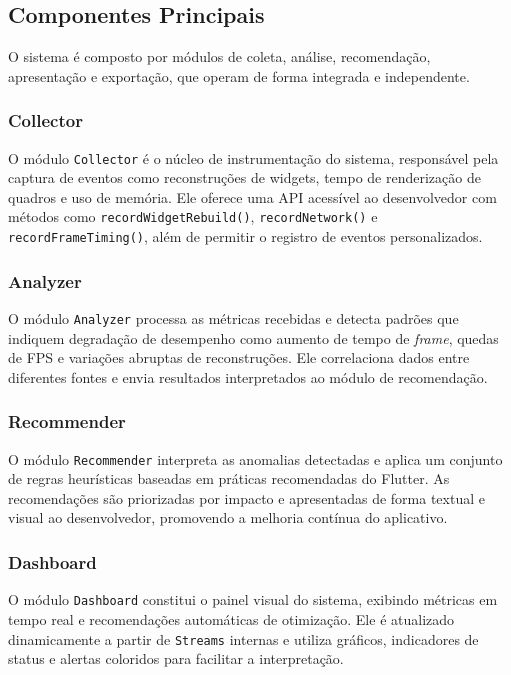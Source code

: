 \subsection{Componentes Principais}

O sistema é composto por módulos de coleta, análise, recomendação, apresentação e exportação, que operam de forma integrada e independente.

\subsubsection{Collector}

O módulo \texttt{Collector} é o núcleo de instrumentação do sistema, responsável pela captura de eventos como reconstruções de widgets, tempo de renderização de quadros e uso de memória.
Ele oferece uma API acessível ao desenvolvedor com métodos como \texttt{recordWidget\-Rebuild()}, \texttt{recordNetwork()} e \texttt{recordFrameTiming()}, além de permitir o registro de eventos personalizados.

\subsubsection{Analyzer}

O módulo \texttt{Analyzer} processa as métricas recebidas e detecta padrões que indiquem degradação de desempenho como aumento de tempo de \textit{frame}, quedas de FPS e variações abruptas de reconstruções.
Ele correlaciona dados entre diferentes fontes e envia resultados interpretados ao módulo de recomendação.

\subsubsection{Recommender}

O módulo \texttt{Recommender} interpreta as anomalias detectadas e aplica um conjunto de regras heurísticas baseadas em práticas recomendadas do Flutter.
As recomendações são priorizadas por impacto e apresentadas de forma textual e visual ao desenvolvedor, promovendo a melhoria contínua do aplicativo.

\subsubsection{Dashboard}

O módulo \texttt{Dashboard} constitui o painel visual do sistema, exibindo métricas em tempo real e recomendações automáticas de otimização.
Ele é atualizado dinamicamente a partir de \texttt{Streams} internas e utiliza gráficos, indicadores de status e alertas coloridos para facilitar a interpretação.

